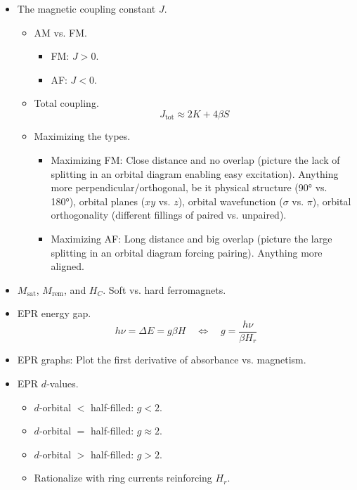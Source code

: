 \documentclass[../notes.tex]{subfiles}
\begin{document}
\begin{itemize}
\begin{itemize}
    \end{itemize}
    \item The magnetic coupling constant $J$.
    \begin{itemize}
        \item AM vs. FM.
        \begin{itemize}
            \item FM: $J>0$.
            \item AF: $J<0$.
        \end{itemize}
        \item Total coupling.
        \begin{equation*}
            J_\text{tot} \approx 2K+4\beta S
        \end{equation*}
        \item Maximizing the types.
        \begin{itemize}
            \item Maximizing FM: Close distance and no overlap (picture the lack of splitting in an orbital diagram enabling easy excitation). Anything more perpendicular/orthogonal, be it physical structure (\ang{90} vs. \ang{180}), orbital planes ($xy$ vs. $z$), orbital wavefunction ($\sigma$ vs. $\pi$), orbital orthogonality (different fillings of paired vs. unpaired).
            \item Maximizing AF: Long distance and big overlap (picture the large splitting in an orbital diagram forcing pairing). Anything more aligned.
        \end{itemize}
    \end{itemize}
    \item $M_\text{sat}$, $M_\text{rem}$, and $H_C$. Soft vs. hard ferromagnets.
    \item EPR energy gap.
    \begin{equation*}
        h\nu = \Delta E = g\beta H
        \quad\Longleftrightarrow\quad
        g = \frac{h\nu}{\beta H_r}
    \end{equation*}
    \item EPR graphs: Plot the first derivative of absorbance vs. magnetism.
    \item EPR $d$-values.
    \begin{itemize}
        \item $d$-orbital $<$ half-filled: $g<2$.
        \item $d$-orbital $=$ half-filled: $g\approx 2$.
        \item $d$-orbital $>$ half-filled: $g>2$.
        \item Rationalize with ring currents reinforcing $H_r$.

\end{itemize}
\end{itemize}
\end{document}
